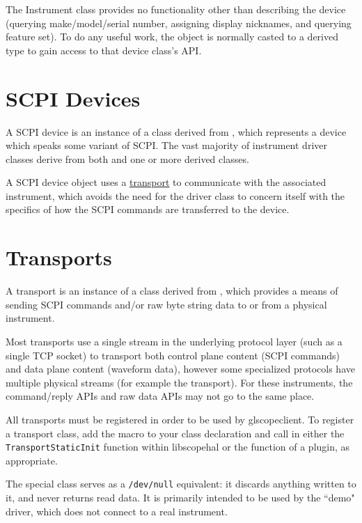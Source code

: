 The Instrument class provides no functionality other than describing the device (querying make/model/serial number,
assigning display nicknames, and querying feature set). To do any useful work, the object is normally casted to a
derived type to gain access to that device class's API.

\section{SCPI Devices}
\label{sec:scpidevices}

A SCPI device is an instance of a class derived from , which represents a device which speaks
some variant of SCPI. The vast majority of instrument driver classes derive from both  and one or
more  derived classes.

A SCPI device object uses a \hyperref[sec:transports]{transport} to communicate with the associated instrument, which
avoids the need for the driver class to concern itself with the specifics of how the SCPI commands are transferred to
the device.

\section{Transports}
\label{sec:transports}

A transport is an instance of a class derived from , which provides a means of sending SCPI
commands and/or raw byte string data to or from a physical instrument.

Most transports use a single stream in the underlying protocol layer (such as a single TCP socket) to transport both
control plane content (SCPI commands) and data plane content (waveform data), however some specialized protocols have
multiple physical streams (for example the  transport). For these instruments, the
command/reply APIs and raw data APIs may not go to the same place.

All transports must be registered in order to be used by glscopeclient. To register a transport class, add the macro
 to your class declaration and call
 in either the \texttt{TransportStaticInit} function within libscopehal or
the  function of a plugin, as appropriate.

The special class  serves as a \texttt{/dev/null} equivalent: it discards anything written
to it, and never returns read data. It is primarily intended to be used by the ``demo" driver, which does not connect
to a real instrument.

